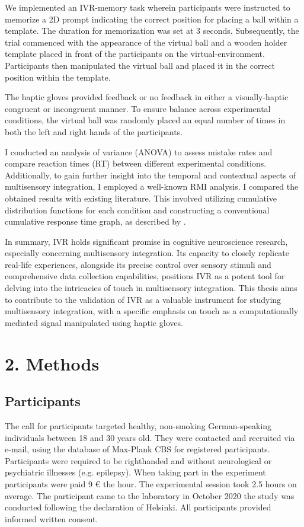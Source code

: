 \documentclass[12pt,oneside,openright]{report}
\begin{document}
We implemented an IVR-memory task wherein participants were instructed to memorize a 2D prompt indicating the correct position for placing a ball within a template. The duration for memorization was set at 3 seconds. Subsequently, the trial commenced with the appearance of the virtual ball and a wooden holder template placed in front of the participants on the virtual-environment. Participants then manipulated the virtual ball and placed it in the correct position within the template.

The haptic gloves provided feedback or no feedback in either a visually-haptic congruent or incongruent manner. To ensure balance across experimental conditions, the virtual ball was randomly placed an equal number of times in both the left and right hands of the participants.

I conducted an analysis of variance (ANOVA) to assess mistake rates and compare reaction times (RT) between different experimental conditions. Additionally, to gain further insight into the temporal and contextual aspects of multisensory integration, I employed a well-known RMI analysis. I compared the obtained results with existing literature. This involved utilizing cumulative distribution functions for each condition and constructing a conventional cumulative response time graph, as described by \parencite{MILLER1982247}.

In summary, IVR holds significant promise in cognitive neuroscience research, especially concerning multisensory integration. Its capacity to closely replicate real-life experiences, alongside its precise control over sensory stimuli and comprehensive data collection capabilities, positions IVR as a potent tool for delving into the intricacies of touch in multisensory integration. This thesis aims to contribute to the validation of IVR as a valuable instrument for studying multisensory integration, with a specific emphasis on touch as a computationally mediated signal manipulated using haptic gloves.

\section*{2. Methods}
\subsection*{Participants}
The call for participants targeted healthy, non-smoking German-speaking individuals between 18 and 30 years old. They were contacted and recruited via e-mail, using the database of Max-Plank CBS for registered participants. Participants were required to be righthanded and without neurological or psychiatric illnesses (e.g. epilepsy). When taking part in the experiment participants were paid 9 € the hour. The experimental session took 2.5 hours on average. The participant came to the laboratory in October 2020 the study was conducted following the declaration of Helsinki. All participants provided informed written consent. 
\end{document}
